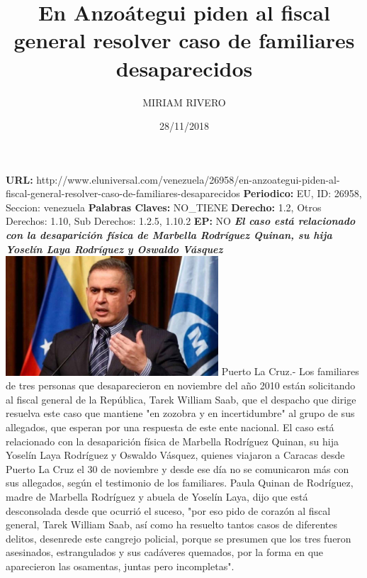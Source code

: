 \documentclass{article}%
\title{\textbf{En Anzoátegui piden al fiscal general resolver caso de familiares desaparecidos}}%
\author{MIRIAM RIVERO}%
\date{28/11/2018}%
\begin{document}
%
\normalsize%
\maketitle%
\textbf{URL: }%
http://www.eluniversal.com/venezuela/26958/en{-}anzoategui{-}piden{-}al{-}fiscal{-}general{-}resolver{-}caso{-}de{-}familiares{-}desaparecidos\newline%
%
\textbf{Periodico: }%
EU, %
ID: %
26958, %
Seccion: %
venezuela\newline%
%
\textbf{Palabras Claves: }%
NO\_TIENE\newline%
%
\textbf{Derecho: }%
1.2, %
Otros Derechos: %
1.10, %
Sub Derechos: %
1.2.5, 1.10.2\newline%
%
\textbf{EP: }%
NO\newline%
\newline%
%
\textbf{\textit{El caso está relacionado con la desaparición física de Marbella Rodríguez Quinan, su hija Yoselín Laya Rodríguez y Oswaldo Vásquez}}%
\newline%
\newline%
%
\includegraphics[width=300px]{234.jpg}%
\newline%
%
Puerto La Cruz.{-} Los familiares de tres personas que desaparecieron en noviembre del año 2010 están solicitando al fiscal general de la República, Tarek William Saab, que el despacho que dirige resuelva este caso que mantiene "en zozobra y en incertidumbre" al grupo de sus allegados, que esperan por una respuesta de este ente nacional.%
\newline%
%
El caso está relacionado con la desaparición física de Marbella Rodríguez Quinan, su hija Yoselín Laya Rodríguez y Oswaldo Vásquez, quienes viajaron a Caracas desde Puerto La Cruz el 30 de noviembre y desde ese día no se comunicaron más con sus allegados, según el testimonio de los familiares.%
\newline%
%
Paula Quinan de Rodríguez,  madre de Marbella Rodríguez y abuela de Yoselín Laya, dijo que está desconsolada desde que ocurrió el suceso, "por eso pido de corazón al fiscal general, Tarek William Saab, así como ha resuelto tantos casos de diferentes delitos, desenrede este cangrejo policial, porque se presumen que los tres fueron asesinados, estrangulados y sus cadáveres quemados, por la forma en que aparecieron las osamentas, juntas pero incompletas".%
\end{document}
